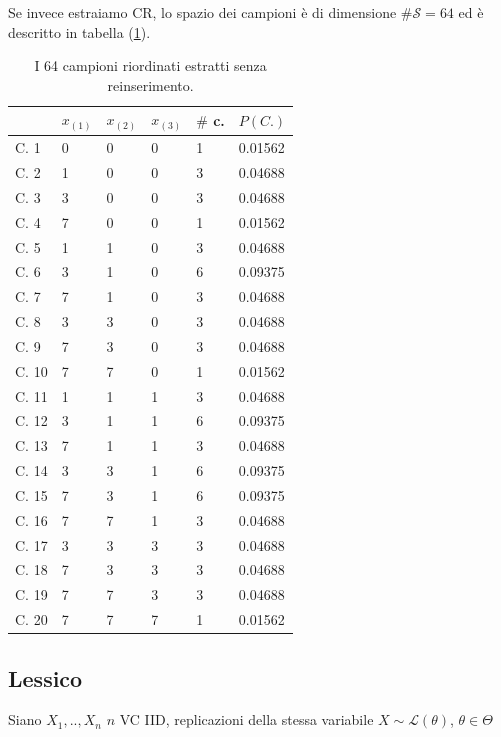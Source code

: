 \documentclass[
  11pt,
]{book}
\theoremstyle{mytheoremstyle}
\theoremstyle{mydefstyle}
\begin{document}
Se invece estraiamo CR, lo spazio dei campioni è di dimensione \(\#\mathcal{S}=64\) ed è descritto in tabella (\ref{tab:ccr}).

\begin{table}
\centering
\caption{\label{tab:ccr}I 64 campioni riordinati estratti senza reinserimento.}
\centering
\fontsize{8}{10}\selectfont
\begin{tabular}[t]{llllll}
\toprule
  & $x_{(1)}$ & $x_{(2)}$ & $x_{(3)}$ & $\#$ c. & $P(C.)$\\
\midrule
C. 1 & 0 & 0 & 0 & 1 & 0.01562\\
C. 2 & 1 & 0 & 0 & 3 & 0.04688\\
C. 3 & 3 & 0 & 0 & 3 & 0.04688\\
C. 4 & 7 & 0 & 0 & 1 & 0.01562\\
C. 5 & 1 & 1 & 0 & 3 & 0.04688\\
\addlinespace
C. 6 & 3 & 1 & 0 & 6 & 0.09375\\
C. 7 & 7 & 1 & 0 & 3 & 0.04688\\
C. 8 & 3 & 3 & 0 & 3 & 0.04688\\
C. 9 & 7 & 3 & 0 & 3 & 0.04688\\
C. 10 & 7 & 7 & 0 & 1 & 0.01562\\
\addlinespace
C. 11 & 1 & 1 & 1 & 3 & 0.04688\\
C. 12 & 3 & 1 & 1 & 6 & 0.09375\\
C. 13 & 7 & 1 & 1 & 3 & 0.04688\\
C. 14 & 3 & 3 & 1 & 6 & 0.09375\\
C. 15 & 7 & 3 & 1 & 6 & 0.09375\\
\addlinespace
C. 16 & 7 & 7 & 1 & 3 & 0.04688\\
C. 17 & 3 & 3 & 3 & 3 & 0.04688\\
C. 18 & 7 & 3 & 3 & 3 & 0.04688\\
C. 19 & 7 & 7 & 3 & 3 & 0.04688\\
C. 20 & 7 & 7 & 7 & 1 & 0.01562\\
\bottomrule
\end{tabular}
\end{table}

\subsection{Lessico}\label{lessico-1}

Siano \(X_1,..,X_n\) \(n\) VC IID, replicazioni della stessa variabile \(X\sim\mathscr{L}(\theta)\), \(\theta\in\Theta\)
\end{document}
